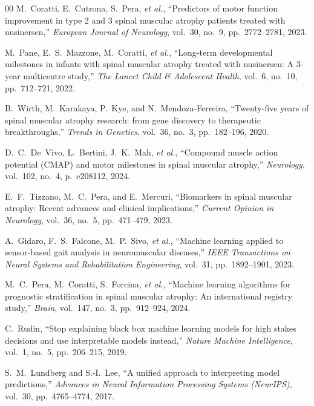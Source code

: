 \documentclass[journal]{IEEEtran}
\begin{document}
\begin{thebibliography}{00}
M.~Coratti, E.~Cutrona, S.~Pera, \textit{et al.}, ``Predictors of motor function improvement in type 2 and 3 spinal muscular atrophy patients treated with nusinersen,'' \textit{European Journal of Neurology}, vol.~30, no.~9, pp.~2772--2781, 2023.

M.~Pane, E.~S.~Mazzone, M.~Coratti, \textit{et al.}, ``Long-term developmental milestones in infants with spinal muscular atrophy treated with nusinersen: A 3-year multicentre study,'' \textit{The Lancet Child \& Adolescent Health}, vol.~6, no.~10, pp.~712--721, 2022.

B.~Wirth, M.~Karakaya, P.~Kye, and N.~Mendoza-Ferreira, ``Twenty-five years of spinal muscular atrophy research: from gene discovery to therapeutic breakthroughs,'' \textit{Trends in Genetics}, vol.~36, no.~3, pp.~182--196, 2020.

D.~C.~De~Vivo, L.~Bertini, J.~K.~Mah, \textit{et al.}, ``Compound muscle action potential (CMAP) and motor milestones in spinal muscular atrophy,'' \textit{Neurology}, vol.~102, no.~4, p.~e208112, 2024.

E.~F.~Tizzano, M.~C.~Pera, and E.~Mercuri, ``Biomarkers in spinal muscular atrophy: Recent advances and clinical implications,'' \textit{Current Opinion in Neurology}, vol.~36, no.~5, pp.~471--479, 2023.

A.~Gidaro, F.~S.~Falcone, M.~P.~Sivo, \textit{et al.}, ``Machine learning applied to sensor-based gait analysis in neuromuscular diseases,'' \textit{IEEE Transactions on Neural Systems and Rehabilitation Engineering}, vol.~31, pp.~1892--1901, 2023.

M.~C.~Pera, M.~Coratti, S.~Forcina, \textit{et al.}, ``Machine learning algorithms for prognostic stratification in spinal muscular atrophy: An international registry study,'' \textit{Brain}, vol.~147, no.~3, pp.~912--924, 2024.

C.~Rudin, ``Stop explaining black box machine learning models for high stakes decisions and use interpretable models instead,'' \textit{Nature Machine Intelligence}, vol.~1, no.~5, pp.~206--215, 2019.

S.~M.~Lundberg and S.-I.~Lee, ``A unified approach to interpreting model predictions,'' \textit{Advances in Neural Information Processing Systems (NeurIPS)}, vol.~30, pp.~4765--4774, 2017.


\end{thebibliography}
\end{document}
